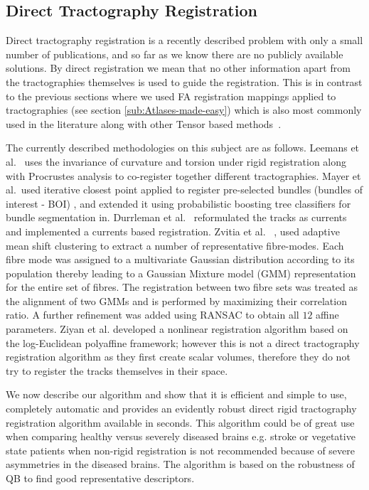 \documentclass[preprint,authoryear,a4paper,10pt,onecolumn]{elsarticle}
\begin{document}

\subsection{Direct Tractography Registration}

Direct tractography registration is a recently described problem with
only a small number of publications, and so far as we know there are no
publicly available solutions. By direct registration we mean that no
other information apart from the tractographies themselves is used to
guide the registration. This is in contrast to the previous sections
where we used FA registration mappings applied to tractographies (see
section \ref{sub:Atlases-made-easy}) which is also most commonly used in
the literature along with other Tensor based
methods~\cite{goh2006algebraic}.

The currently described methodologies on this subject are as follows.
Leemans et al.~\cite{leemans2006multiscale} uses the invariance of
curvature and torsion under rigid registration along with Procrustes
analysis to co-register together different tractographies. Mayer et
al.~used iterative closest point applied to register pre-selected
bundles (bundles of interest - BOI) \cite{mayer2008bundles},
\cite{mayerdirect} and extended it using probabilistic boosting tree
classifiers for bundle segmentation
in\cite{mayer2011supervised}. Durrleman et
al.~\cite{durrleman2010registration} reformulated the tracks as currents
and implemented a currents based registration. Zvitia et
al.~\cite{zvitia2008adaptive} \cite{Zvitia2010}, used adaptive mean
shift clustering to extract a number of representative
fi{}bre-modes. Each fibre mode was assigned to a multivariate Gaussian
distribution according to its population thereby leading to a Gaussian
Mixture model (GMM) representation for the entire set of fibres. The
registration between two fibre sets was treated as the alignment of two
GMMs and is performed by maximizing their correlation ratio. A further
refinement was added using RANSAC\cite{fischler1981random} to obtain all
$12$ affine parameters. Ziyan et al.\cite{ZiyanMICCAI07} developed a
nonlinear registration algorithm based on the log-Euclidean polyaffine
framework\cite{Arsigny2009}; however this is not a direct tractography
registration algorithm as they first create scalar volumes, therefore
they do not try to register the tracks themselves in their space.

We now describe our algorithm and show that it is efficient and simple
to use, completely automatic and provides an evidently robust direct
rigid tractography registration algorithm available in seconds. This
algorithm could be of great use when comparing healthy versus severely
diseased brains e.g. stroke or vegetative state patients when non-rigid
registration is not recommended because of severe asymmetries in the
diseased brains. The algorithm is based on the robustness of QB to find
good representative descriptors.
\end{document}
